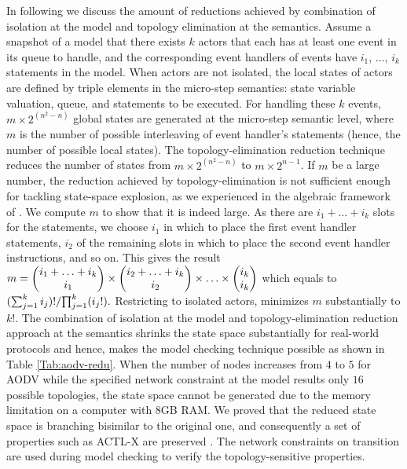 In following we discuss the amount of reductions achieved by combination of isolation at the model and topology elimination at the semantics. Assume a snapshot of a model that there exists $k$ actors that each has at least one event in its queue to handle, and the corresponding event handlers of events have $i_1$, $\ldots$, $i_k$ statements in the model. When actors are not isolated, the local states of actors are defined by triple elements in the micro-step semantics: state variable valuation, queue, and statements to be executed. For handling these $k$ events, $m\times 2^{(n^2-n)}$ global states are generated at the micro-step semantic level, where $m$ is the number of possible interleaving of event handler's statements (hence, the number of possible local states). The topology-elimination reduction technique reduces the number of states from $m\times 2^{(n^2-n)}$ to $m\times2^{n-1}$. If $m$ be a large number, the reduction achieved by topology-elimination is not sufficient enough for tackling state-space explosion, as we experienced in the algebraic framework of \cite{FOAC}.  We compute $m$ to show that it is indeed large. As there are $i_1+\ldots+i_k$ slots for the statements, we choose $i_1$ in which to place the first event handler statements, $i_2$ of the remaining slots in which to place the second event handler instructions, and so on. This gives the result  ${\small m=\begin{pmatrix}
	i_1+\ldots+i_k\\
	i_1 \\
	\end{pmatrix}\times
	\begin{pmatrix}
	i_2+\ldots+i_k\\
	i_2 \\
	\end{pmatrix}\times	\ldots\times
	\begin{pmatrix}
	i_k\\
	i_k \\
	\end{pmatrix}}$ which equals to ${\small %
{(\sum_{j=1}^{k} i_j)!}/{\prod_{j=1}^{k}(i_j!)}.}$ 
Restricting to isolated actors, minimizes $m$ substantially to $k!$. The combination of isolation at the model and topology-elimination reduction approach at the semantics shrinks the state space substantially for real-world protocols and hence, makes the model checking technique possible as shown in Table \ref{Tab:aodv-redu}. When the number of nodes increases from $4$ to $5$ for AODV while the specified network constraint at the model results only $16$ possible topologies, the state space cannot be generated due to the memory limitation on a computer with $8${GB} {RAM}.  We proved that the reduced state space is branching bisimilar to the
original one, and consequently a set of properties such as {ACTL-X} are preserved \cite{FOAC}. The network constraints on transition are used during model checking \cite{FORM,CSI2018} to verify the topology-sensitive properties. 

